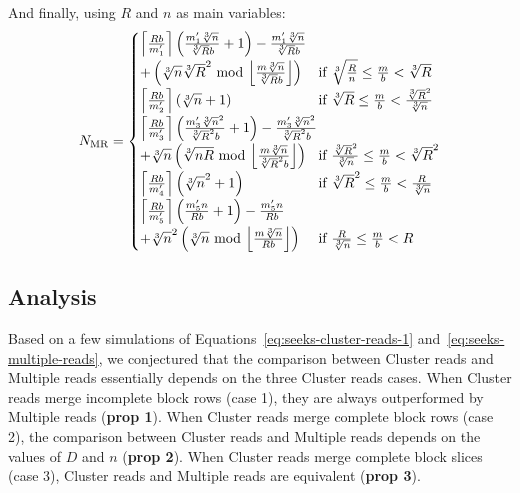 \documentclass[10pt, conference, compsocconf]{IEEEtran}
\DeclarePairedDelimiter{\ceil}{\lceil}{\rceil}
\DeclarePairedDelimiter{\floor}{\lfloor}{\rfloor}
\begin{document}
And finally, using $R$ and $n$ as main variables:
\begin{equation}
N_\mathrm{MR} =
\begin{cases}
  \ceil*{\frac{Rb}{m_1'}}\left(\frac{m_1'\sqrt[3]{n}}{\sqrt[3]{R}b}+1\right)-\frac{m_1'\sqrt[3]{n}}{\sqrt[3]{R}b}\\[0.4em]
   +\left( \sqrt[3]{n}\sqrt[3]{R}^2 \text{ mod }\floor*{\frac{m\sqrt[3]{n}}{\sqrt[3]{R}b}}\right)\
  & \text{\hspace*{-0.9em}if } \sqrt[3]{\frac{R}{n}} \leq \frac{m}{b} < \sqrt[3]{R}\\[0.4em]

  \ceil*{\frac{Rb}{m_2'}}\left(\sqrt[3]{n}+1\right)\
  & \text{\hspace*{-0.9em}if } \sqrt[3]{R} \leq \frac{m}{b} < \frac{\sqrt[3]{R}^2}{\sqrt[3]{n}}\\[0.4em]

  \ceil*{\frac{Rb}{m_3'}}\left(\frac{m'_3\sqrt[3]{n}^2}{\sqrt[3]{R}^2b}+1\right)-\frac{m'_3\sqrt[3]{n}^2}{\sqrt[3]{R}^2b}\\[0.4em]
  +\sqrt[3]{n}\left( \sqrt[3]{nR} \text{ mod } \floor*{\frac{m\sqrt[3]{n}}{\sqrt[3]{R}^2b}} \right)
  & \text{\hspace*{-0.9em}if } \frac{\sqrt[3]{R}^2}{\sqrt[3]{n}} \leq \frac{m}{b} < \sqrt[3]{R}^2\\[0.4em]

  \ceil*{\frac{Rb}{m_4'}}\left(\sqrt[3]{n}^2+1\right)\
  & \text{\hspace*{-0.9em}if } \sqrt[3]{R}^2 \leq \frac{m}{b} < \frac{R}{\sqrt[3]{n}}\\[0.4em]

  \ceil*{\frac{Rb}{m_5'}}\left(\frac{m_5'n}{Rb}+1\right)-\frac{m_5'n}{Rb}\\[0.4em]
  +\sqrt[3]{n}^2\left( \sqrt[3]{n} \text{ mod } \floor*{\frac{m\sqrt[3]{n}}{Rb}}\right)
  & \text{\hspace*{-0.9em}if } \frac{R}{\sqrt[3]{n}} \leq \frac{m}{b} < R
\end{cases} \label{eq:seeks-multiple-reads}
\end{equation}

\subsection{Analysis}
\label{sec:analysis}
Based on a few simulations of Equations~\ref{eq:seeks-cluster-reads-1}
and~\ref{eq:seeks-multiple-reads}, we conjectured that the comparison
between Cluster reads and Multiple reads essentially depends on the
three Cluster reads cases. When Cluster reads merge incomplete block
rows (case 1), they are always outperformed by Multiple reads
(\textbf{prop 1}).  When Cluster reads merge complete block rows (case
2), the comparison between Cluster reads and Multiple reads depends on
the values of $D$ and $n$ (\textbf{prop 2}). When Cluster reads merge complete
block slices (case 3), Cluster reads and Multiple reads are equivalent
(\textbf{prop 3}).
\end{document}
